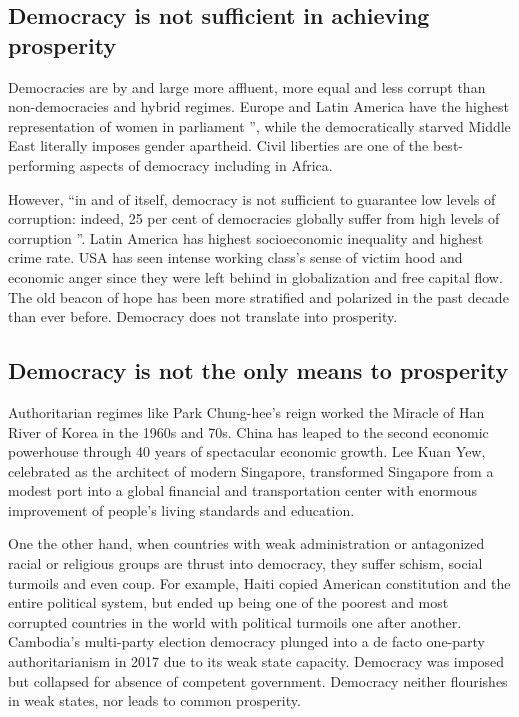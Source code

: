 \documentclass{scrartcl}
\begin{document}
\subsection{Democracy is not sufficient in achieving prosperity}

Democracies are by and large more affluent, more equal and less corrupt
than non-democracies and hybrid regimes. Europe and Latin America
have the highest representation of women in parliament ''\autocite[6]{IDEA},
while the democratically starved Middle East literally imposes gender
apartheid. Civil liberties are one of the best-performing aspects
of democracy including in Africa. 

However, ``in and of itself, democracy is not sufficient to guarantee
low levels of corruption: indeed, 25 per cent of democracies globally
suffer from high levels of corruption ''\autocite[3]{IDEA}. Latin
America has highest socioeconomic inequality and highest crime rate.
USA has seen intense working class's sense of victim hood and economic
anger since they were left behind in globalization and free capital
flow. The old beacon of hope has been more stratified and polarized
in the past decade than ever before. Democracy does not translate
into prosperity. 

\subsection{Democracy is not the only means to prosperity}

Authoritarian regimes like Park Chung-hee's reign worked the Miracle
of Han River of Korea in the 1960s and 70s. China has leaped to the
second economic powerhouse through 40 years of spectacular economic
growth. Lee Kuan Yew, celebrated as the architect of modern Singapore,
transformed Singapore from a modest port into a global financial and
transportation center with enormous improvement of people's living
standards and education. 

One the other hand, when countries with weak administration or antagonized
racial or religious groups are thrust into democracy, they suffer
schism, social turmoils and even coup. For example, Haiti copied American
constitution and the entire political system, but ended up being one
of the poorest and most corrupted countries in the world with political
turmoils one after another. Cambodia’s multi-party election democracy
plunged into a de facto one-party authoritarianism in 2017 due to
its weak state capacity. Democracy was imposed but collapsed for absence
of competent government. Democracy neither flourishes in weak states,
nor leads to common prosperity. 
\end{document}
